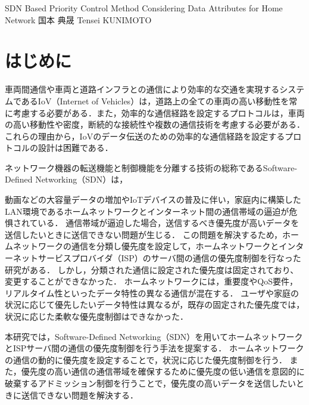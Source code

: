 \documentclass[a4paper,10pt,twocolumn,uplatex]{jsarticle}
\date{9}
\begin{document}
{SDN Based Priority Control Method Considering Data Attributes for Home Network}
{国本 典晟}
{Tensei KUNIMOTO}

\section{はじめに}
車両間通信や車両と道路インフラとの通信により効率的な交通を実現するシステムであるIoV（Internet of Vehicles）は，道路上の全ての車両の高い移動性を常に考慮する必要がある．また，効率的な通信経路を設定するプロトコルは，車両の高い移動性や密度，断続的な接続性や複数の通信技術を考慮する必要がある．これらの理由から，IoVのデータ伝送のための効率的な通信経路を設定するプロトコルの設計は困難である．\par
ネットワーク機器の転送機能と制御機能を分離する技術の総称であるSoftware-Defined Networking（SDN）は，

動画などの大容量データの増加やIoTデバイスの普及に伴い，家庭内に構築したLAN環境であるホームネットワークとインターネット間の通信帯域の逼迫が危惧されている\cite{ガイドライン}．
通信帯域が逼迫した場合，送信するべき優先度が高いデータを送信したいときに送信できない問題が生じる．
この問題を解決するため，ホームネットワークの通信を分類し優先度を設定して，ホームネットワークとインターネットサービスプロバイダ（ISP）のサーバ間の通信の優先度制御を行なった研究がある\cite{AQRA}．
しかし，分類された通信に設定された優先度は固定されており、変更することができなかった．
ホームネットワークには，重要度やQoS要件，リアルタイム性といったデータ特性の異なる通信が混在する．
ユーザや家庭の状況に応じて優先したいデータ特性は異なるが，既存の固定された優先度では，状況に応じた柔軟な優先度制御はできなかった．\par
本研究では，Software-Defined Networking（SDN）を用いてホームネットワークとISPサーバ間の通信の優先度制御を行う手法を提案する．
ホームネットワークの通信の動的に優先度を設定することで，状況に応じた優先度制御を行う．
また，優先度の高い通信の通信帯域を確保するために優先度の低い通信を意図的に破棄するアドミッション制御を行うことで，優先度の高いデータを送信したいときに送信できない問題を解決する．
\end{document}
